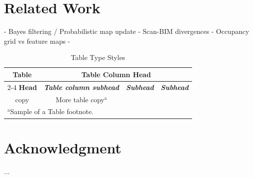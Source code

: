 \documentclass[conference]{IEEEtran}
\begin{document}
\section{Related Work}
- Bayes filtering / Probabilistic map update
- Scan-BIM divergences
- Occupancy grid vs feature maps
- 





\begin{table}[htbp]
\caption{Table Type Styles}
\begin{center}
\begin{tabular}{|c|c|c|c|}
\hline
\textbf{Table}&\multicolumn{3}{|c|}{\textbf{Table Column Head}} \\
\cline{2-4} 
\textbf{Head} & \textbf{\textit{Table column subhead}}& \textbf{\textit{Subhead}}& \textbf{\textit{Subhead}} \\
\hline
copy& More table copy$^{\mathrm{a}}$& &  \\
\hline
\multicolumn{4}{l}{$^{\mathrm{a}}$Sample of a Table footnote.}
\end{tabular}
\label{tab1}
\end{center}
\end{table}


\section*{Acknowledgment}
...
\end{document}
